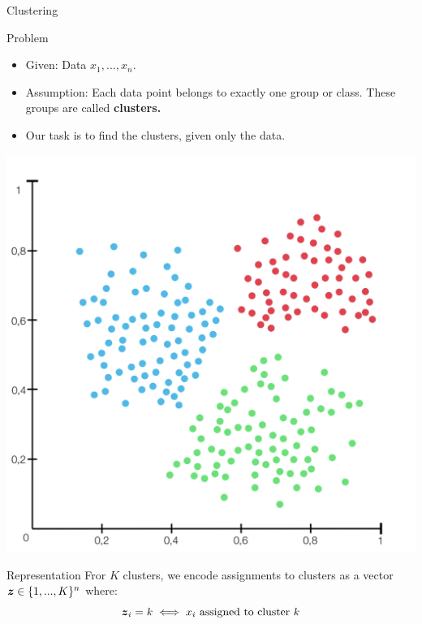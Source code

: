 \documentclass[10pt]{beamer}
\newcommand{\assign}{z} %
\begin{document}
\begin{frame}{Clustering}
\begin{sblock}{Problem}
\begin{minipage}{0.6\textwidth}
\begin{itemize}
\item Given: Data $x_1, ..., x_n$.
\item Assumption: Each data point belongs to exactly one group or class. These groups are called \bf{clusters}.
\item Our task is to find the clusters, given only the data.
\end{itemize}
\end{minipage} 
\hfill
\begin{minipage}{0.3\textwidth}
\includegraphics[width=\textwidth]{images/clustering}
\end{minipage} 

\end{sblock}

\begin{sblock}{Representation}
Fror $K$ clusters, we encode assignments to clusters as a vector $\+\assign \in \set{1,...,K}^n$ where:
\[ \+\assign_i = k \iff x_i \text{ assigned to cluster } k \]
\end{sblock}


\end{frame}
\end{document}

